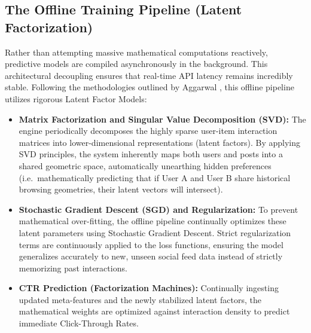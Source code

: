 \subsection{The Offline Training Pipeline (Latent Factorization)}
Rather than attempting massive mathematical computations reactively, predictive models are compiled asynchronously in the background. This architectural decoupling ensures that real-time API latency remains incredibly stable. Following the methodologies outlined by Aggarwal \cite{aggarwal2016}, this offline pipeline utilizes rigorous Latent Factor Models:
\begin{itemize}
    \item \textbf{Matrix Factorization and Singular Value Decomposition (SVD):} The engine periodically decomposes the highly sparse user-item interaction matrices into lower-dimensional representations (latent factors). By applying SVD principles, the system inherently maps both users and posts into a shared geometric space, automatically unearthing hidden preferences (i.e.\ mathematically predicting that if User A and User B share historical browsing geometries, their latent vectors will intersect).
    \item \textbf{Stochastic Gradient Descent (SGD) and Regularization:} To prevent mathematical over-fitting, the offline pipeline continually optimizes these latent parameters using Stochastic Gradient Descent. Strict regularization terms are continuously applied to the loss functions, ensuring the model generalizes accurately to new, unseen social feed data instead of strictly memorizing past interactions.
    \item \textbf{CTR Prediction (Factorization Machines):} Continually ingesting updated meta-features and the newly stabilized latent factors, the mathematical weights are optimized against interaction density to predict immediate Click-Through Rates.
\end{itemize}

